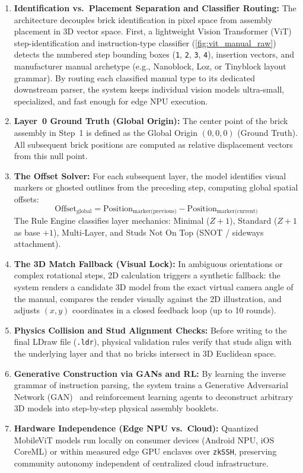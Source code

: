 \documentclass[a4paper,11pt,twoside,parskip=half-,headings=small]{scrartcl}
\newcommand{\code}[1]{\texttt{#1}}
\begin{document}
\begin{enumerate}[nosep]
  \item \textbf{Identification vs.\ Placement Separation and Classifier Routing:} The architecture decouples brick identification in pixel space from assembly placement in 3D vector space. First, a lightweight Vision Transformer (ViT) step-identification and instruction-type classifier (\cref{fig:vit_manual_raw}) detects the numbered step bounding boxes (\code{1}, \code{2}, \code{3}, \code{4}), insertion vectors, and manufacturer manual archetype (e.g., Nanoblock, Loz, or Tinyblock layout grammar). By routing each classified manual type to its dedicated downstream parser, the system keeps individual vision models ultra-small, specialized, and fast enough for edge NPU execution.
  \item \textbf{Layer~0 Ground Truth (Global Origin):} The center point of the brick assembly in Step~1 is defined as the Global Origin $(0, 0, 0)$ (Ground Truth). All subsequent brick positions are computed as relative displacement vectors from this null point.
  \item \textbf{The Offset Solver:} For each subsequent layer, the model identifies visual markers or ghosted outlines from the preceding step, computing global spatial offsets:
  \begin{equation}
    \text{Offset}_{\text{global}} = \text{Position}_{\text{marker(previous)}} - \text{Position}_{\text{marker(current)}}
  \end{equation}
  The Rule Engine classifies layer mechanics: Minimal ($Z+1$), Standard ($Z+1$ as base $+1$), Multi-Layer, and Studs Not On Top (SNOT / sideways attachment).
  \item \textbf{The 3D Match Fallback (Visual Lock):} In ambiguous orientations or complex rotational steps, 2D calculation triggers a synthetic fallback: the system renders a candidate 3D model from the exact virtual camera angle of the manual, compares the render visually against the 2D illustration, and adjusts $(x, y)$ coordinates in a closed feedback loop (up to 10 rounds).
  \item \textbf{Physics Collision and Stud Alignment Checks:} Before writing to the final LDraw file (\code{.ldr}), physical validation rules verify that studs align with the underlying layer and that no bricks intersect in 3D Euclidean space.
  \item \textbf{Generative Construction via GANs and RL:} By learning the inverse grammar of instruction parsing, the system trains a Generative Adversarial Network (GAN)~\cite{goodfellow2014gan} and reinforcement learning agents to deconstruct arbitrary 3D models into step-by-step physical assembly booklets.
  \item \textbf{Hardware Independence (Edge NPU vs.\ Cloud):} Quantized MobileViT models run locally on consumer devices (Android NPU, iOS CoreML) or within measured edge GPU enclaves over \code{zkSSH}, preserving community autonomy independent of centralized cloud infrastructure.
\end{enumerate}
\end{document}
